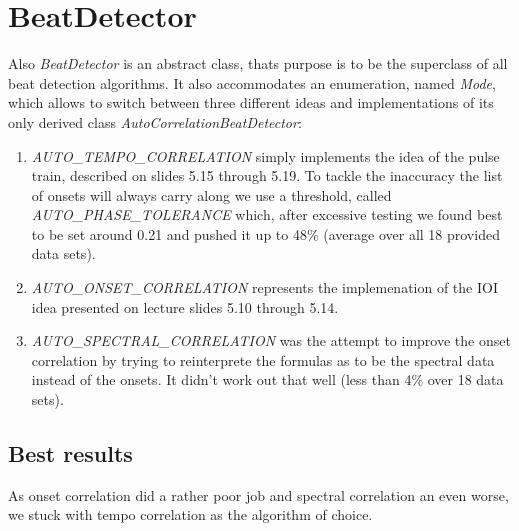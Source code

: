 \section{\ttfamily BeatDetector}
Also \emph{BeatDetector} is an abstract class, thats purpose is to be the
superclass of all beat detection algorithms. It also accommodates an
enumeration, named \emph{Mode}, which allows to switch between three different
ideas and implementations of its only derived class
\emph{AutoCorrelationBeatDetector}:

\begin{enumerate}
  \item \emph{AUTO\_TEMPO\_CORRELATION} simply implements the idea of the pulse
  train, described on slides 5.15 through 5.19. To tackle the inaccuracy the
  list of onsets will always carry along we use a threshold, called
  \emph{AUTO\_PHASE\_TOLERANCE} which, after excessive testing we found best to
  be set around 0.21 and pushed it up to 48\% (average over all 18 provided data
  sets).
  \item \emph{AUTO\_ONSET\_CORRELATION} represents the implemenation of the IOI
  idea presented on lecture slides 5.10 through 5.14.
  \item \emph{AUTO\_SPECTRAL\_CORRELATION} was the attempt to improve the onset
  correlation by trying to reinterprete the formulas as to be the spectral data
  instead of the onsets. It didn't work out that well (less than 4\% over 18
  data sets).
\end{enumerate}


\subsection{Best results}
As onset correlation did a rather poor job and spectral correlation an even
worse, we stuck with tempo correlation as the algorithm of choice.
